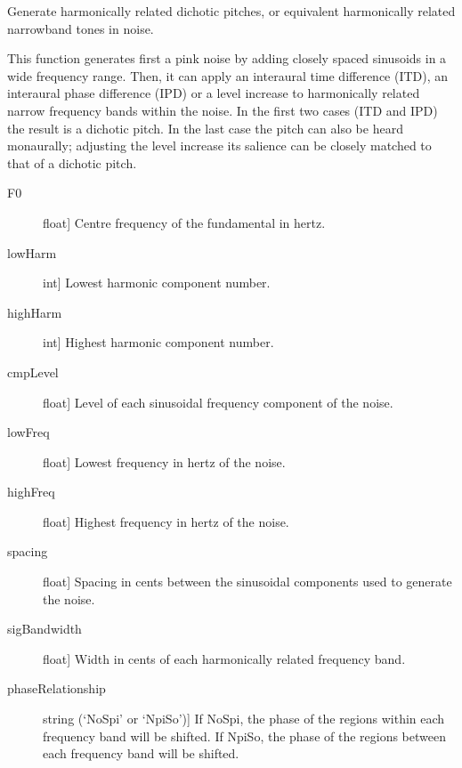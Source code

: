 \documentclass[letterpaper,10pt,english]{sphinxmanual}
\begin{document}
\begin{fulllineitems}
\label{index:sndlib.makeSimpleDichotic}
Generate harmonically related dichotic pitches, or equivalent
harmonically related narrowband tones in noise.

This function generates first a pink noise by adding closely spaced
sinusoids in a wide frequency range. Then, it can apply an interaural
time difference (ITD), an interaural phase difference (IPD) or a
level increase to harmonically related narrow frequency bands
within the noise. In the first two cases (ITD and IPD) the result
is a dichotic pitch. In the last case the pitch can also be heard
monaurally; adjusting the level increase its salience can be closely
matched to that of a dichotic pitch.
\begin{description}
\item[{F0}] \leavevmode{[}float{]}
Centre frequency of the fundamental in hertz.

\item[{lowHarm}] \leavevmode{[}int{]}
Lowest harmonic component number.

\item[{highHarm}] \leavevmode{[}int{]}
Highest harmonic component number.

\item[{cmpLevel}] \leavevmode{[}float{]}
Level of each sinusoidal frequency component of the noise.

\item[{lowFreq}] \leavevmode{[}float{]}
Lowest frequency in hertz of the noise.

\item[{highFreq}] \leavevmode{[}float{]}
Highest frequency in hertz of the noise.

\item[{spacing}] \leavevmode{[}float{]}
Spacing in cents between the sinusoidal components used to generate the
noise.

\item[{sigBandwidth}] \leavevmode{[}float{]}
Width in cents of each harmonically related frequency band.

\item[{phaseRelationship}] \leavevmode{[}string (`NoSpi' or `NpiSo'){]}
If NoSpi, the phase of the regions within each frequency band will
be shifted. If NpiSo, the phase of the regions between each
frequency band will be shifted.


\end{description}
\end{fulllineitems}
\end{document}
